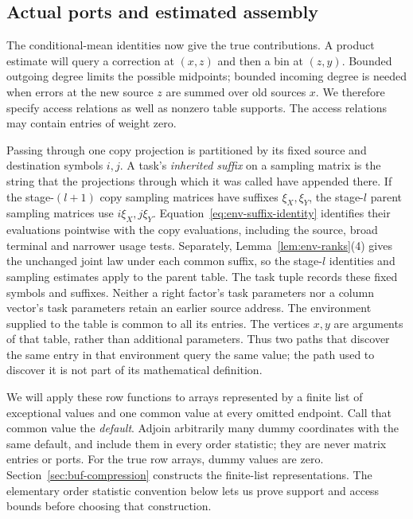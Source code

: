 \subsection{Actual ports and estimated assembly}

The conditional-mean identities now give the true contributions.  A
product estimate will query a correction at $(x,z)$ and then a bin at
$(z,y)$.  Bounded outgoing degree limits the possible midpoints; bounded
incoming degree is needed when errors at the new source $z$ are summed
over old sources $x$.  We therefore specify access relations as well as
nonzero table supports.  The access relations may contain entries of
weight zero.

Passing through one copy projection is partitioned by its fixed source
and destination symbols $i,j$.  A task's \emph{inherited suffix} on a
sampling matrix is the string that the projections through which it was called
have appended there.  If the stage-$(l+1)$ copy sampling matrices have suffixes
$\xi_X,\xi_Y$, the stage-$l$ parent sampling matrices use $i\xi_X,j\xi_Y$.
Equation~\eqref{eq:env-suffix-identity} identifies their evaluations
pointwise with the copy evaluations, including the source, broad terminal
and narrower usage tests.  Separately, Lemma~\ref{lem:env-ranks}(4)
gives the unchanged joint law under each common suffix, so the stage-$l$
identities and sampling estimates apply to the parent table.  The task
tuple records these fixed symbols and suffixes.  Neither a right factor's
task parameters nor a column vector's task parameters retain an earlier
source address.
The environment supplied to the table is common to all its entries.
The vertices $x,y$ are arguments of that table, rather than additional
parameters.  Thus two paths that discover the same entry in that
environment query the same value; the path used to discover it is not
part of its mathematical definition.

We will apply these row functions to arrays represented by a finite list
of exceptional values and one common value at every omitted endpoint.
Call that common value the \emph{default}.  Adjoin arbitrarily many dummy
coordinates with the same default, and include them in every order statistic; they
are never matrix entries or ports.  For the true row arrays, dummy values
are zero.  Section~\ref{sec:buf-compression} constructs the finite-list
representations.  The elementary order statistic convention below lets us prove
support and access bounds before choosing that construction.

